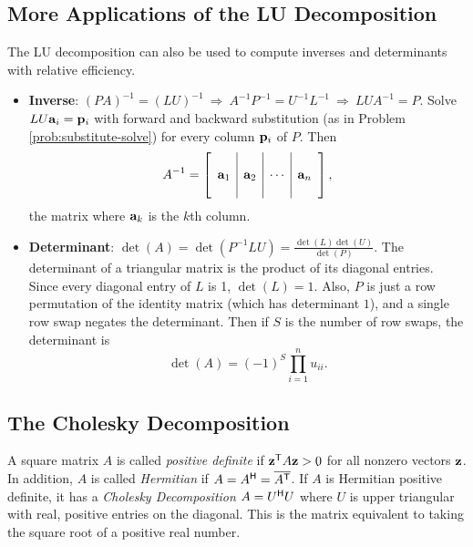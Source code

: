 \subsection*{More Applications of the LU Decomposition} %

The LU decomposition can also be used to compute inverses and determinants with relative efficiency.

\begin{itemize}
\item \textbf{Inverse}:
$(PA)^{-1} = (LU)^{-1} \ \Longrightarrow\ A^{-1}P^{-1} = U^{-1}L^{-1} \ \Longrightarrow\ LUA^{-1} = P$.
Solve $LU{\bf{a}}_i = \mathbf{p}_i$ with forward and backward substitution (as in Problem \ref{prob:substitute-solve}) for every column $\mathbf{p}_i$ of $P$.
Then
\begin{align*}
A^{-1} =
\left[\begin{array}{c|c|c|c}
&&&\\
{\bf{a}}_1&{\bf{a}}_2&\cdots&{\bf{a}}_n
\\&&&
\end{array}\right],
\end{align*}
the matrix where ${\bf{a}}_k$ is the $k$th column.

\item \textbf{Determinant}: %
$\det(A) = \det(P^{-1}LU) = \frac{\det(L)\det(U)}{\det(P)}$.
The determinant of a triangular matrix is the product of its diagonal entries. Since every diagonal entry of $L$ is 1, $\det(L) = 1$.
Also, $P$ is just a row permutation of the identity matrix (which has determinant $1$), and a single row swap negates the determinant.
Then if $S$ is the number of row swaps, the determinant is
\[\det(A) = (-1)^S\prod_{i=1}^nu_{ii}.\]
\end{itemize}

\subsection*{The Cholesky Decomposition} %

A square matrix $A$ is called \emph{positive definite} if $\mathbf{z}^{\mathsf T} A\mathbf{z} > 0$ for all nonzero vectors $\mathbf{z}$.
In addition, $A$ is called \emph{Hermitian} if $A = A^{\mathsf H} = \overline{A^{\mathsf T}}$.
If $A$ is Hermitian positive definite, it has a \emph{Cholesky Decomposition} $A = U^{\mathsf H} U$ where $U$ is upper triangular with real, positive entries on the diagonal.
This is the matrix equivalent to taking the square root of a positive real number.

